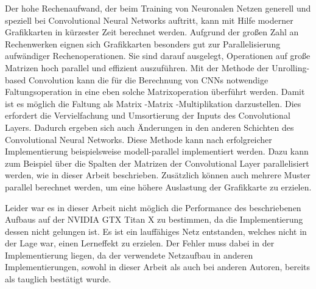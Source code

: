 \documentclass[../main.tex]{subfiles}
\begin{document}
Der hohe Rechenaufwand, der beim Training von Neuronalen Netzen generell und speziell bei Convolutional Neural Networks auftritt, kann mit Hilfe moderner Grafikkarten in kürzester Zeit berechnet werden. Aufgrund der großen Zahl an Rechenwerken eignen sich Grafikkarten besonders gut zur Parallelisierung aufwändiger Rechenoperationen. Sie sind darauf ausgelegt, Operationen auf große Matrizen hoch parallel und effizient auszuführen. Mit der Methode der Unrolling-based Convolution kann die für die Berechnung von CNNs notwendige Faltungsoperation in eine eben solche Matrixoperation überführt werden. Damit ist es möglich die Faltung als Matrix -Matrix -Multiplikation darzustellen. Dies erfordert die Vervielfachung und Umsortierung der Inputs des Convolutional Layers. Dadurch ergeben sich auch Änderungen in den anderen Schichten des Convolutional Neural Networks. Diese Methode kann nach erfolgreicher Implementierung beispielsweise modell-parallel implementiert werden. Dazu kann zum Beispiel über die Spalten der Matrizen der Convolutional Layer parallelisiert werden, wie in dieser Arbeit beschrieben. Zusätzlich können auch mehrere Muster parallel berechnet werden, um eine höhere Auslastung der Grafikkarte zu erzielen. \par 
Leider war es in dieser Arbeit nicht möglich die Performance des beschriebenen Aufbaus auf der NVIDIA GTX Titan X zu bestimmen, da die Implementierung dessen nicht gelungen ist. Es ist ein lauffähiges Netz entstanden, welches nicht in der Lage war, einen Lerneffekt zu erzielen. Der Fehler muss dabei in der Implementierung liegen, da der verwendete Netzaufbau in anderen Implementierungen, sowohl in dieser Arbeit als auch bei anderen Autoren, bereits als tauglich bestätigt wurde. 
\end{document}

